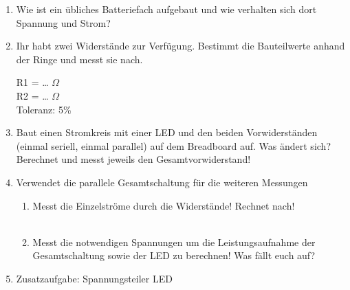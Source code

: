 
\begin{enumerate}
  \item Wie ist ein übliches Batteriefach aufgebaut und wie verhalten sich dort
    Spannung und Strom? \\
  \item Ihr habt zwei Widerstände zur Verfügung. Bestimmt die Bauteilwerte
    anhand der Ringe und messt sie nach.
    \begin{center}
    R1 = \dots {} $\Omega$ \\
    R2 = \dots {} $\Omega$ \\
    Toleranz: 5\%
    \end{center}
  \item Baut einen Stromkreis mit einer LED und den beiden Vorwiderständen
    (einmal seriell, einmal parallel) auf dem Breadboard auf. Was ändert sich?
    Berechnet und messt jeweils den Gesamtvorwiderstand! \\
  \item Verwendet die parallele Gesamtschaltung für die weiteren Messungen
    \begin{enumerate}
      \item Messt die Einzelströme durch die Widerstände! Rechnet nach! \\
        \\
      \item Messt die notwendigen Spannungen um die Leistungsaufnahme der
        Gesamtschaltung sowie der LED zu berechnen! Was fällt euch auf? \\
    \end{enumerate}
  \item Zusatzaufgabe: Spannungsteiler LED\\

\end{enumerate}

